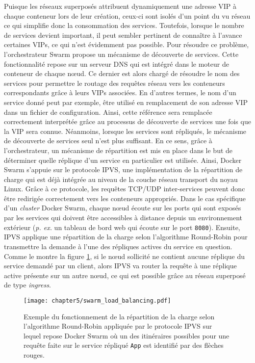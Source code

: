 Puisque les réseaux superposés attribuent dynamiquement une adresse \acl{VIP} à chaque conteneur lors de leur création, ceux-ci sont isolés d'un point du vu réseau ce qui simplifie donc la consommation des services. Toutefois, lorsque le nombre de services devient important, il peut sembler pertinent de connaître à l'avance certaines \acsp{VIP}, ce qui n'est évidemment pas possible. Pour résoudre ce problème, l'orchestrateur Swarm propose un mécanisme de découverte de services. Cette fonctionnalité repose sur un serveur DNS qui est intégré dans le moteur de conteneur de chaque n\oe{}ud. Ce dernier est alors chargé de résoudre le nom des services pour permettre le routage des requêtes réseau vers les conteneurs correspondants grâce à leurs \acsp{VIP} associées.  En d'autres termes, le nom d'un service donné peut par exemple, être utilisé en remplacement de son adresse \acl{VIP} dans un fichier de configuration. Ainsi, cette référence sera remplacée correctement interprétée grâce au processus de découverte de services une fois que la \acs{VIP} sera connue. Néanmoins, lorsque les services sont répliqués, le mécanisme de découverte de services seul n'est plus suffisant. En ce sens, grâce à l'orchestrateur,  un mécanisme de répartition est mis en place dans le but de déterminer quelle réplique d'un service en particulier est utilisée. Ainsi, Docker Swarm s'appuie sur le protocole \ac{IPVS}, une implémentation de la répartition de charge qui est déjà intégrée au niveau de la couche réseau transport du noyau Linux. Grâce à ce protocole, les requêtes \acs{TCP}/\acs{UDP} inter-services peuvent donc être redirigée correctement vers les conteneurs appropriés. Dans le cas spécifique d'un \textit{cluster} Docker Swarm, chaque n\oe{}ud écoute sur les ports qui sont exposés par les services qui doivent être accessibles à distance depuis un environnement extérieur (\textit{p. ex.} un tableau de bord web qui écoute sur le port \texttt{8080}). Ensuite, \acs{IPVS} applique une répartition de la charge selon l'algorithme Round-Robin \citep{Ghaffarinejad2014} pour transmettre la demande à l'une des répliques actives du service en question. Comme le montre la figure \ref{fig:swarm_load_balancing}, si le n\oe{}ud sollicité ne contient aucune réplique du service demandé par un client, alors \acs{IPVS} va router la requête à une réplique active présente sur un autre n\oe{}ud, ce qui est possible grâce au réseau superposé de type \textit{ingress}.

\begin{figure}[t]
	\centering
	\texttt{[image: chapter5/swarm\_load\_balancing.pdf]}
        \caption{Exemple du fonctionnement de la répartition de la charge selon l'algorithme Round-Robin appliquée par le protocole \acs{IPVS} sur lequel repose Docker Swarm où un des itinéraires possibles pour une requête faite sur le service répliqué \texttt{App} est identifié par des flèches rouges.}
	\label{fig:swarm_load_balancing}
\end{figure}


